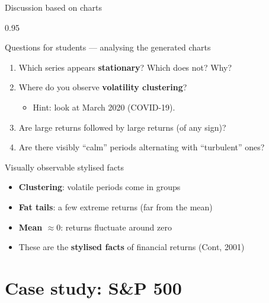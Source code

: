 \documentclass[9pt, aspectratio=169, t]{beamer}
\begin{document}
\begin{frame}{Discussion based on charts}
    \begin{cminipage}{0.95\textwidth}
    \begin{alertblock}{Questions for students --- analysing the generated charts}
    \begin{enumerate}\setlength{\itemsep}{0pt}
        \item Which series appears \textbf{stationary}? Which does not? Why?
        \item Where do you observe \textbf{volatility clustering}?
        \begin{itemize}\setlength{\itemsep}{0pt}
            \item Hint: look at March 2020 (COVID-19).
        \end{itemize}
        \item Are large returns followed by large returns (of any sign)?
        \item Are there visibly ``calm'' periods alternating with ``turbulent'' ones?
    \end{enumerate}
    \end{alertblock}
    \vspace{0.1cm}
    \begin{exampleblock}{Visually observable stylised facts}
    \begin{itemize}\setlength{\itemsep}{0pt}
        \item \textbf{Clustering}: volatile periods come in groups
        \item \textbf{Fat tails}: a few extreme returns (far from the mean)
        \item \textbf{Mean $\approx 0$}: returns fluctuate around zero
        \item These are the \textbf{stylised facts} of financial returns (Cont, 2001)
    \end{itemize}
    \end{exampleblock}
    \end{cminipage}
\end{frame}

\section{Case study: S\&P 500}
\end{document}
